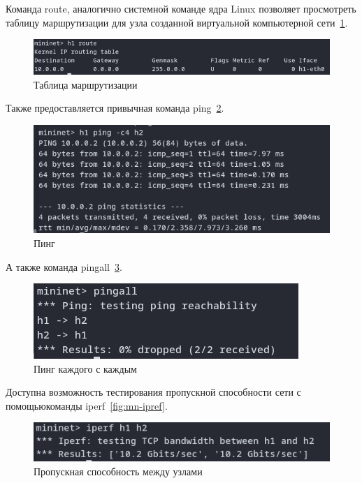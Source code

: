 \documentclass[bachelor, och, coursework]{SCWorks}
\begin{document}
Команда route, аналогично системной команде ядра Linux позволяет просмотреть таблицу маршрутизации для узла  созданной виртуальной компьютерной сети~\ref{fig:mn-route}.
\begin{figure}[H]
    \centering
    \includegraphics[width=\textwidth]{mn-route}
    \caption{Таблица маршрутизации}\label{fig:mn-route}
\end{figure}

Также предоставляется привычная команда ping~\ref{fig:mn-ping}.
\begin{figure}[H]
    \centering
    \includegraphics[width=\textwidth]{mn-ping}
    \caption{Пинг}\label{fig:mn-ping}
\end{figure}

А также команда pingall~\ref{fig:mn-pingall}.
\begin{figure}[H]
    \centering
    \includegraphics[width=\textwidth]{mn-pingall}
    \caption{Пинг каждого с каждым}\label{fig:mn-pingall}
\end{figure}

Доступна возможность тестирования пропускной способности сети с помощьюкоманды iperf~\ref{fig:mn-ipref}.
\begin{figure}[H]
    \centering
    \includegraphics[width=\textwidth]{mn-iperf}
    \caption{Пропускная способность между узлами}\label{fig:mn-iperf}
\end{figure}
\end{document}
